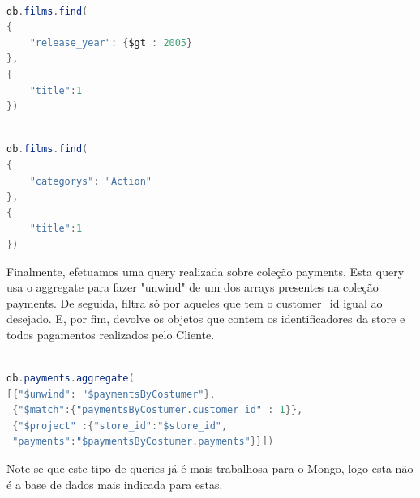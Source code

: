 \begin{lstlisting}[language=java,caption=Query ao Mongo para devolver todos os Filmes estreados depois de 2005]

db.films.find(
{
	"release_year": {$gt : 2005}
},
{
	"title":1
})

\end{lstlisting}

\begin{lstlisting}[language=java,caption=Query ao Mongo para devolver todos os Filmes da Categoria Action]

db.films.find(
{
	"categorys": "Action"
},
{
	"title":1
})
\end{lstlisting}

Finalmente, efetuamos uma query realizada sobre coleção payments. Esta query usa o aggregate para fazer "unwind" de um dos arrays presentes na coleção payments. De seguida, filtra só por aqueles que tem o customer\_id igual ao desejado. E, por fim, devolve os objetos que contem os identificadores da store e todos pagamentos realizados pelo Cliente.

\begin{lstlisting}[language=java,caption=Query para obter as faturas de um dado Cliente organizado por Store]

db.payments.aggregate(
[{"$unwind": "$paymentsByCostumer"},
 {"$match":{"paymentsByCostumer.customer_id" : 1}},
 {"$project" :{"store_id":"$store_id",
 "payments":"$paymentsByCostumer.payments"}}])

\end{lstlisting}

Note-se que este tipo de queries já é mais trabalhosa para o Mongo, logo esta não é a base de dados mais indicada para estas.
